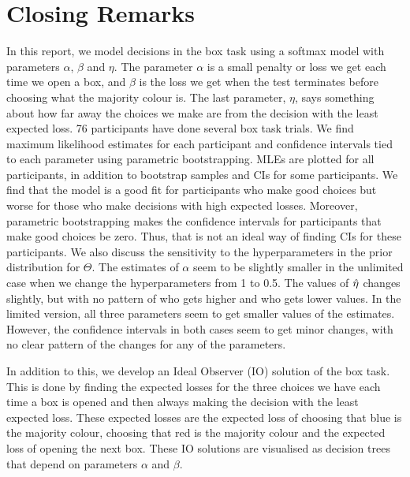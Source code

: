 \chapter{Closing Remarks}
In this report, we model decisions in the box task using a softmax model with parameters $\alpha$, $\beta$ and $\eta$. The parameter $\alpha$ is a small penalty or loss we get each time we open a box, and $\beta$ is the loss we get when the test terminates before choosing what the majority colour is. The last parameter, $\eta$, says something about how far away the choices we make are from the decision with the least expected loss.
76 participants have done several box task trials. We find maximum likelihood estimates for each participant and confidence intervals tied to each parameter using parametric bootstrapping. MLEs are plotted for all participants, in addition to bootstrap samples and CIs for some participants. 
We find that the model is a good fit for participants who make good choices but worse for those who make decisions with high expected losses. Moreover, parametric bootstrapping makes the confidence intervals for participants that make good choices be zero. Thus, that is not an ideal way of finding CIs for these participants.
We also discuss the sensitivity to the hyperparameters in the prior distribution for $\Theta$. The estimates of $\alpha$ seem to be slightly smaller in the unlimited case when we change the hyperparameters from 1 to 0.5. The values of $\hat{\eta}$ changes slightly, but with no pattern of who gets higher and who gets lower values. 
In the limited version, all three parameters seem to get smaller values of the estimates. However, the confidence intervals in both cases seem to get minor changes, with no clear pattern of the changes for any of the parameters. 

In addition to this, we develop an Ideal Observer (IO) solution of the box task. This is done by finding the expected losses for the three choices we have each time a box is opened and then always making the decision with the least expected loss. These expected losses are the expected loss of choosing that blue is the majority colour, choosing that red is the majority colour and the expected loss of opening the next box. These IO solutions are visualised as decision trees that depend on parameters $\alpha$ and $\beta$.

